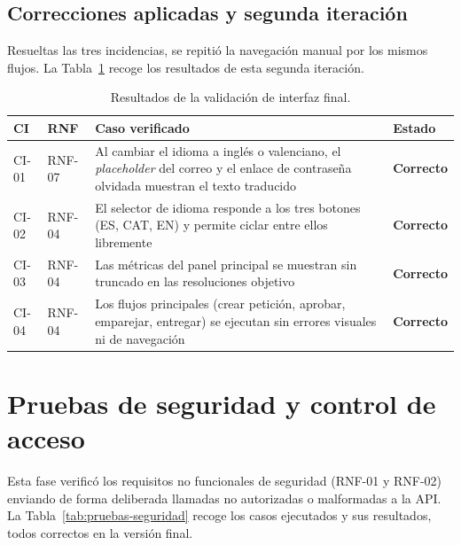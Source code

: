 \documentclass[11pt,oneside,spanish,listoffigures,listoftables]{tfgetsinf}
\begin{document}
\subsection{Correcciones aplicadas y segunda iteración}

Resueltas las tres incidencias, se repitió la navegación manual por los mismos flujos. La Tabla~\ref{tab:pruebas-ui} recoge los resultados de esta segunda iteración.

\begin{table}[ht]
\centering
\caption[Resultados de la validación de interfaz final]{Resultados de la validación de interfaz final.}
\label{tab:pruebas-ui}
\footnotesize
\renewcommand{\arraystretch}{1.3}
\begin{tabularx}{\textwidth}{%
  >{\raggedright\arraybackslash}p{0.7cm}%
  >{\raggedright\arraybackslash}p{0.9cm}%
  >{\raggedright\arraybackslash}X%
  >{\raggedright\arraybackslash}p{1.4cm}}
\toprule
\textbf{CI} & \textbf{RNF} & \textbf{Caso verificado} & \textbf{Estado} \\
\midrule
CI-01 & RNF-07 & Al cambiar el idioma a inglés o valenciano, el \textit{placeholder} del correo y el enlace de contraseña olvidada muestran el texto traducido & \textbf{Correcto} \\
CI-02 & RNF-04 & El selector de idioma responde a los tres botones (ES, CAT, EN) y permite ciclar entre ellos libremente & \textbf{Correcto} \\
CI-03 & RNF-04 & Las métricas del panel principal se muestran sin truncado en las resoluciones objetivo & \textbf{Correcto} \\
CI-04 & RNF-04 & Los flujos principales (crear petición, aprobar, emparejar, entregar) se ejecutan sin errores visuales ni de navegación & \textbf{Correcto} \\
\bottomrule
\end{tabularx}
\end{table}

\section{Pruebas de seguridad y control de acceso}

Esta fase verificó los requisitos no funcionales de seguridad (RNF-01 y RNF-02) enviando de forma deliberada llamadas no autorizadas o malformadas a la API. La Tabla~\ref{tab:pruebas-seguridad} recoge los casos ejecutados y sus resultados, todos correctos en la versión final.
\end{document}
